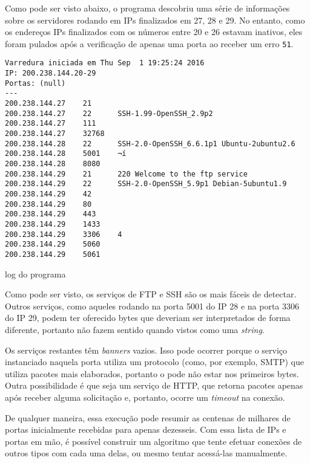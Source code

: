 \documentclass{sig-alternate-05-2015}
\begin{document}
Como pode ser visto abaixo, o programa descobriu uma série de informações sobre os servidores rodando em IPs finalizados em 27, 28 e 29.
No entanto, como os endereços IPs finalizados com os números entre 20 e 26 estavam inativos, eles foram pulados após a verificação de apenas uma porta ao receber um erro \texttt{51}.


\begin{log}
\centering
\begin{lstlisting}
Varredura iniciada em Thu Sep  1 19:25:24 2016
IP: 200.238.144.20-29
Portas: (null)
---
200.238.144.27    21	 
200.238.144.27    22      SSH-1.99-OpenSSH_2.9p2
200.238.144.27    111     
200.238.144.27    32768     
200.238.144.28    22      SSH-2.0-OpenSSH_6.6.1p1 Ubuntu-2ubuntu2.6
200.238.144.28    5001    ¬í
200.238.144.28    8080     
200.238.144.29    21      220 Welcome to the ftp service
200.238.144.29    22      SSH-2.0-OpenSSH_5.9p1 Debian-5ubuntu1.9
200.238.144.29    42     
200.238.144.29    80     
200.238.144.29    443     
200.238.144.29    1433     
200.238.144.29    3306    4
200.238.144.29    5060     
200.238.144.29    5061     
\end{lstlisting}
\caption{log do programa}
\end{log}

Como pode ser visto, os serviços de FTP e SSH são os mais fáceis de detectar.
Outros serviços, como aqueles rodando na porta 5001 do IP 28 e na porta 3306 do IP 29, podem ter oferecido bytes que deveriam ser interpretados de forma diferente, portanto não fazem sentido quando vistos como uma \textit{string}.

Os serviços restantes têm \textit{banners} vazios.
Isso pode ocorrer porque o serviço instanciado naquela porta utiliza um protocolo (como, por exemplo, SMTP) que utiliza pacotes mais elaborados, portanto o \banner pode não estar nos primeiros bytes.
Outra possibilidade é que seja um serviço de HTTP, que retorna pacotes apenas após receber alguma solicitação e, portanto, ocorre um \textit{timeout} na conexão.

De qualquer maneira, essa execução pode resumir as centenas de milhares de portas inicialmente recebidas para apenas dezesseis.
Com essa lista de IPs e portas em mão, é possível construir um algoritmo que tente efetuar conexões de outros tipos com cada uma delas, ou mesmo tentar acessá-las manualmente.

%

%
%
\end{document}
